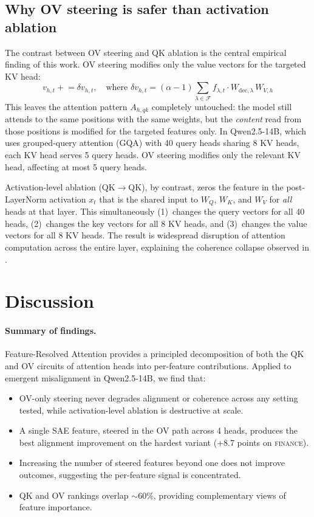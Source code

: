 \documentclass{article}
\theoremstyle{plain}
\theoremstyle{definition}
\theoremstyle{remark}
\newcommand{\WQ}{W_Q}
\newcommand{\WK}{W_K}
\newcommand{\WV}{W_V}
\begin{document}
\subsection{Why OV steering is safer than activation ablation}
\label{sec:ov_vs_qk}

The contrast between OV steering and QK ablation is the central empirical finding of this work. OV steering modifies only the value vectors for the targeted KV head:
\begin{equation}
    v_{h,t} \mathrel{+}= \delta v_{h,t}, \quad \text{where } \delta v_{h,t} = (\alpha - 1) \sum_{\lambda \in \mathcal{F}} f_{\lambda,t} \cdot W_{\mathrm{dec},\lambda}\,W_{V,h}
\end{equation}
This leaves the attention pattern $A_{h,qk}$ completely untouched: the model still attends to the same positions with the same weights, but the \emph{content} read from those positions is modified for the targeted features only. In Qwen2.5-14B, which uses grouped-query attention (GQA) with 40 query heads sharing 8 KV heads, each KV head serves 5 query heads. OV steering modifies only the relevant KV head, affecting at most 5 query heads.

Activation-level ablation (QK$\to$QK), by contrast, zeros the feature in the post-LayerNorm activation $x_t$ that is the shared input to $\WQ$, $\WK$, and $\WV$ for \emph{all} heads at that layer. This simultaneously (1)~changes the query vectors for all 40 heads, (2)~changes the key vectors for all 8 KV heads, and (3)~changes the value vectors for all 8 KV heads. The result is widespread disruption of attention computation across the entire layer, explaining the coherence collapse observed in .


\section{Discussion}
\label{sec:discussion}

\paragraph{Summary of findings.} Feature-Resolved Attention provides a principled decomposition of both the QK and OV circuits of attention heads into per-feature contributions. Applied to emergent misalignment in Qwen2.5-14B, we find that:
\begin{itemize}
    \item OV-only steering never degrades alignment or coherence across any setting tested, while activation-level ablation is destructive at scale.
    \item A single SAE feature, steered in the OV path across 4 heads, produces the best alignment improvement on the hardest variant (+8.7 points on \textsc{finance}).
    \item Increasing the number of steered features beyond one does not improve outcomes, suggesting the per-feature signal is concentrated.
    \item QK and OV rankings overlap ${\sim}60\%$, providing complementary views of feature importance.
\end{itemize}
\end{document}
